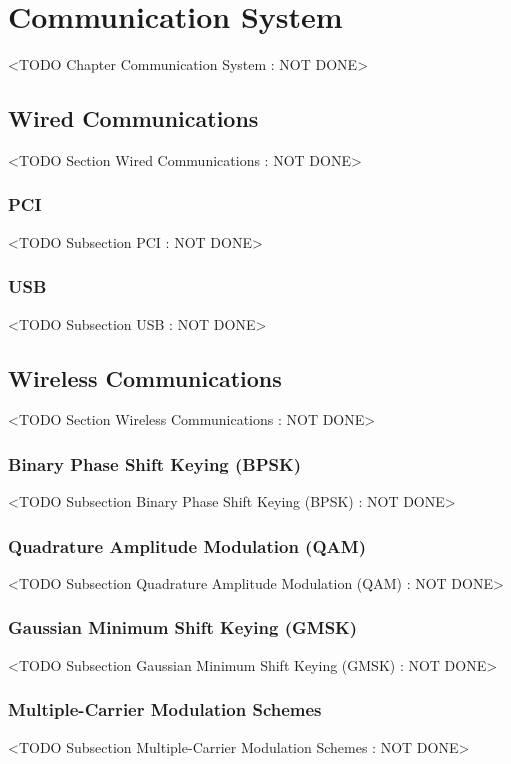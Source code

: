 \chapter{Communication System}
	<TODO Chapter Communication System : NOT DONE>

\section{Wired Communications}
	<TODO Section Wired Communications : NOT DONE>

\subsection{PCI}
	<TODO Subsection PCI : NOT DONE>

\subsection{USB}
	<TODO Subsection USB : NOT DONE>

\section{Wireless Communications}
	<TODO Section Wireless Communications : NOT DONE>

\subsection{Binary Phase Shift Keying (BPSK)}
	<TODO Subsection Binary Phase Shift Keying (BPSK) : NOT DONE>

\subsection{Quadrature Amplitude Modulation (QAM)}
	<TODO Subsection Quadrature Amplitude Modulation (QAM) : NOT DONE>

\subsection{Gaussian Minimum Shift Keying (GMSK)}
	<TODO Subsection Gaussian Minimum Shift Keying (GMSK) : NOT DONE>

\subsection{Multiple-Carrier Modulation Schemes}
	<TODO Subsection Multiple-Carrier Modulation Schemes : NOT DONE>

